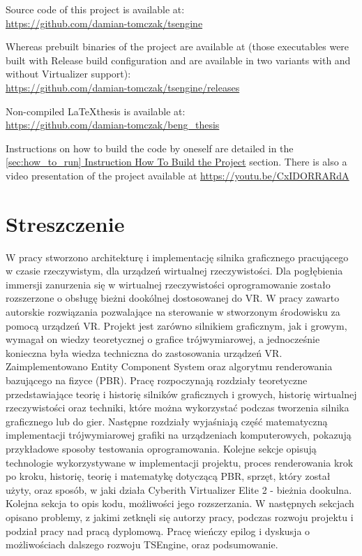 Source code of this project is available at:\\
\href{https://github.com/damian-tomczak/tsengine}{https://github.com/damian-tomczak/tsengine}

Whereas prebuilt binaries of the project are available at (those executables were built with Release build configuration and are available in two variants with and without Virtualizer support):\\
\href{https://github.com/damian-tomczak/tsengine/releases}{https://github.com/damian-tomczak/tsengine/releases}

Non-compiled \LaTeX thesis is available at:\\
\href{https://github.com/damian-tomczak/beng_thesis}{https://github.com/damian-tomczak/beng\_thesis}

Instructions on how to build the code by oneself are detailed in the \hyperref[sec:how_to_run]{\ref*{sec:how_to_run} Instruction How To Build the Project} section. There is also a video presentation of the project available at \href{https://youtu.be/CxIDORRARdA}{https://youtu.be/CxIDORRARdA}
\newpage
\section{Streszczenie}
\hspace{\parindent}
W pracy stworzono architekturę i implementację silnika graficznego pracującego w czasie rzeczywistym, dla urządzeń wirtualnej rzeczywistości. Dla pogłębienia immersji zanurzenia się w wirtualnej rzeczywistości oprogramowanie zostało rozszerzone o obsługę bieżni dookólnej dostosowanej do VR. W pracy zawarto autorskie rozwiązania pozwalające na sterowanie w stworzonym środowisku za pomocą urządzeń VR. Projekt jest zarówno silnikiem graficznym, jak i growym, wymagał on wiedzy teoretycznej o grafice trójwymiarowej, a jednocześnie konieczna była wiedza techniczna do zastosowania urządzeń VR. Zaimplementowano Entity Component System oraz algorytmu renderowania bazującego na fizyce (PBR). Pracę rozpoczynają rozdziały teoretyczne przedstawiające teorię i historię silników graficznych i growych, historię wirtualnej rzeczywistości oraz techniki, które można wykorzystać podczas tworzenia silnika graficznego lub do gier. Następne rozdziały wyjaśniają część matematyczną implementacji trójwymiarowej grafiki na urządzeniach komputerowych, pokazują przykładowe sposoby testowania oprogramowania. Kolejne sekcje opisują technologie wykorzystywane w implementacji projektu, proces renderowania krok po kroku, historię, teorię i matematykę dotyczącą PBR, sprzęt, który został użyty, oraz sposób, w jaki działa Cyberith Virtualizer Elite 2 - bieżnia dookulna. Kolejna sekcja to opis kodu, możliwości jego rozszerzania. W następnych sekcjach opisano problemy, z jakimi zetknęli się autorzy pracy, podczas rozwoju projektu i podział pracy nad pracą dyplomową. Pracę wieńczy epilog i dyskusja o możliwościach dalszego rozwoju TSEngine, oraz podsumowanie.


